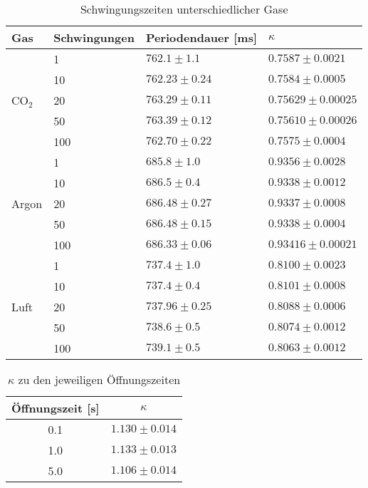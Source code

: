 \documentclass[12pt,a4paper,titlepage,headinclude,bibtotoc]{scrartcl}
\begin{document}
\begin{table}
	\centering
	\begin{tabular}{|l|l|l|l|}
		\hline
		Gas 	&Schwingungen & Periodendauer [ms] & $\kappa$ \\\hline\hline

			& 1 	& $762.1 \pm 1.1$	& $0.7587 \pm 0.0021$ \\
			& 10 	& $762.23 \pm 0.24$ 	& $0.7584 \pm 0.0005$ \\
		CO$_2$	& 20 	& $763.29 \pm 0.11$ 	& $0.75629 \pm 0.00025$ \\
			& 50 	& $763.39 \pm 0.12$ 	& $0.75610 \pm 0.00026$ \\
			& 100 	& $762.70 \pm 0.22$	& $0.7575 \pm 0.0004$ \\\hline
	
			& 1 	& $685.8 \pm 1.0$	& $0.9356 \pm 0.0028$ \\
			& 10	& $686.5 \pm 0.4$	& $0.9338 \pm 0.0012$ \\
		Argon	& 20	& $686.48 \pm 0.27$	& $0.9337 \pm 0.0008$ \\
			& 50	& $686.48 \pm 0.15$	& $0.9338 \pm 0.0004$ \\
			& 100	& $686.33 \pm 0.06$	& $0.93416 \pm 0.00021$ \\\hline
	
			& 1	& $737.4 \pm 1.0$	& $0.8100 \pm 0.0023$ \\
			& 10	& $737.4 \pm 0.4$	& $0.8101 \pm 0.0008$ \\
		Luft	& 20	& $737.96 \pm 0.25$	& $0.8088 \pm 0.0006$ \\
			& 50	& $738.6 \pm 0.5$	& $0.8074 \pm 0.0012$ \\
			& 100	& $739.1 \pm 0.5$	& $0.8063 \pm 0.0012$ \\\hline
	\end{tabular}
	\caption{Schwingungszeiten unterschiedlicher Gase}
	\label{tab:schwingungszeit}
\end{table}

\begin{table}[!htb]
	\centering
	\begin{tabular}{|c|c|}
		\hline
		Öffnungszeit [s] & $\kappa$\\\hline
		0.1 & $1.130 \pm 0.014$\\
		1.0 & $1.133 \pm 0.013$\\
		5.0 & $1.106 \pm 0.014$\\
		\hline
	\end{tabular}
	\caption{$\kappa$ zu den jeweiligen Öffnungszeiten}
	\label{tab:kappaclement}
\end{table}
\end{document}
